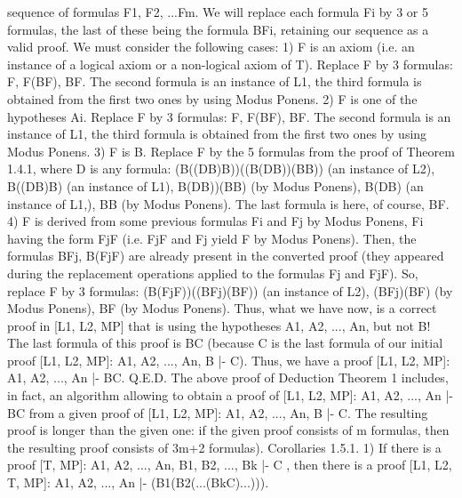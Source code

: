 sequence of formulas F1, F2, ...Fm. We will replace each formula Fi by 3 or 5 formulas, the last of these
being the formula B\IMPLIES Fi, retaining our sequence as a valid proof.
We must consider the following cases:
1) F is an axiom (i.e. an instance of a logical axiom or a non-logical axiom of T). Replace F by 3
formulas: F, F\IMPLIES (B\IMPLIES F), B\IMPLIES F. The second formula is an instance of L1, the third formula is obtained
from the first two ones by using Modus Ponens.
2) F is one of the hypotheses Ai. Replace F by 3 formulas: F, F\IMPLIES (B\IMPLIES F), B\IMPLIES F. The second formula is an
instance of L1, the third formula is obtained from the first two ones by using Modus Ponens.
3) F is B. Replace F by the 5 formulas from the proof of Theorem 1.4.1, where D is any formula:
(B\IMPLIES ((D\IMPLIES B)\IMPLIES B))\IMPLIES ((B\IMPLIES (D\IMPLIES B))\IMPLIES (B\IMPLIES B)) (an instance of L2),
B\IMPLIES ((D\IMPLIES B)\IMPLIES B) (an instance of L1),
B\IMPLIES (D\IMPLIES B))\IMPLIES (B\IMPLIES B) (by Modus Ponens),
B\IMPLIES (D\IMPLIES B) (an instance of L1,),
B\IMPLIES B (by Modus Ponens).
The last formula is here, of course, B\IMPLIES F.
4) F is derived from some previous formulas Fi and Fj by Modus Ponens, Fi having the form Fj\IMPLIES F (i.e.
Fj\IMPLIES F and Fj yield F by Modus Ponens). Then, the formulas
B\IMPLIES Fj,
B\IMPLIES (Fj\IMPLIES F)
are already present in the converted proof (they appeared during the replacement operations applied to the
formulas Fj and Fj\IMPLIES F). So, replace F by 3 formulas:
(B\IMPLIES (Fj\IMPLIES F))\IMPLIES ((B\IMPLIES Fj)\IMPLIES (B\IMPLIES F)) (an instance of L2),
(B\IMPLIES Fj)\IMPLIES (B\IMPLIES F) (by Modus Ponens),
B\IMPLIES F (by Modus Ponens).
Thus, what we have now, is a correct proof in [L1, L2, MP] that is using the hypotheses A1, A2, ..., An, but
not B! The last formula of this proof is B\IMPLIES C (because C is the last formula of our initial proof [L1, L2,
MP]: A1, A2, ..., An, B |- C). Thus, we have a proof [L1, L2, MP]: A1, A2, ..., An |- B\IMPLIES C. Q.E.D.
The above proof of Deduction Theorem 1 includes, in fact, an algorithm allowing to obtain a proof of
[L1, L2, MP]: A1, A2, ..., An |- B\IMPLIES C from a given proof of [L1, L2, MP]: A1, A2, ..., An, B |- C. The
resulting proof is longer than the given one: if the given proof consists of m formulas, then the resulting
proof consists of 3m+2 formulas).
Corollaries 1.5.1. 1) If there is a proof [T, MP]: A1, A2, ..., An, B1, B2, ..., Bk |- C , then there is a proof
[L1, L2, T, MP]: A1, A2, ..., An |- (B1\IMPLIES (B2\IMPLIES (...\IMPLIES (Bk\IMPLIES C)...))).
